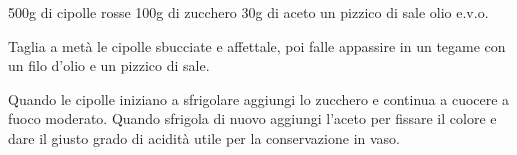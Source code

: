 \begin{ingreds}
	500g di cipolle rosse
	100g di zucchero
	30g di aceto
	un pizzico di sale
	olio e.v.o.

\end{ingreds}

\begin{method}
Taglia a metà le cipolle sbucciate e affettale, poi falle appassire in un tegame con un filo d'olio e un pizzico di sale.

Quando le cipolle iniziano a sfrigolare aggiungi lo zucchero e continua a cuocere a fuoco moderato. Quando sfrigola di nuovo aggiungi l'aceto per fissare il colore e dare il giusto grado di acidità utile per la conservazione in vaso.



\end{method}



